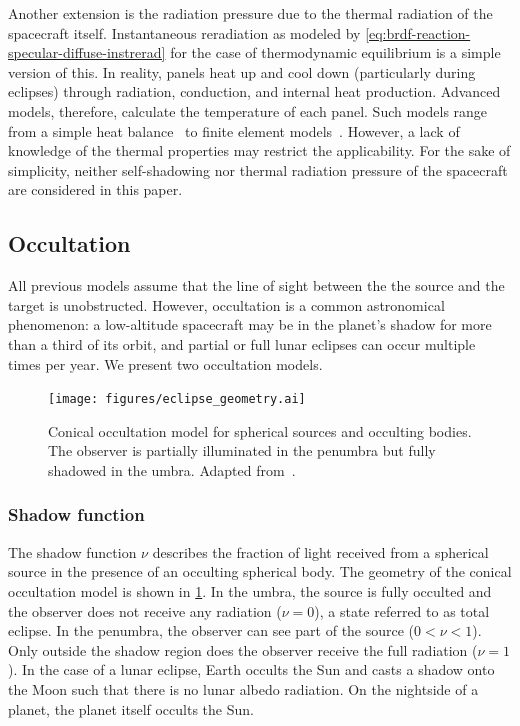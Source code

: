 Another extension is the radiation pressure due to the thermal radiation of the spacecraft itself. Instantaneous reradiation as modeled by \cref{eq:brdf-reaction-specular-diffuse-instrerad} for the case of thermodynamic equilibrium is a simple version of this. In reality, panels heat up and cool down (particularly during eclipses) through radiation, conduction, and internal heat production. Advanced models, therefore, calculate the temperature of each panel. Such models range from a simple heat balance~\cite{Wetterer2014} to finite element models~\cite{Woeske2019}. However, a lack of knowledge of the thermal properties may restrict the applicability. For the sake of simplicity, neither self-shadowing nor thermal radiation pressure of the spacecraft are considered in this paper.



\subsection{Occultation}
All previous models assume that the line of sight between the the source and the target is unobstructed. However, occultation is a common astronomical phenomenon: a low-altitude spacecraft may be in the planet's shadow for more than a third of its orbit, and partial or full lunar eclipses can occur multiple times per year. We present two occultation models.


\begin{figure}[t]
    \centering
    \texttt{[image: figures/eclipse\_geometry.ai]}
    \caption{Conical occultation model for spherical sources and occulting bodies. The observer is partially illuminated in the penumbra but fully shadowed in the umbra. Adapted from~\cite{Vallado2013}.}
    \label{fig:eclipse-geometry}
\end{figure}

\subsubsection{Shadow function}
The shadow function $\nu$ describes the fraction of light received from a spherical source in the presence of an occulting spherical body. The geometry of the conical occultation model is shown in \cref{fig:eclipse-geometry}. In the umbra, the source is fully occulted and the observer does not receive any radiation ($\nu = 0$), a state referred to as total eclipse. In the penumbra, the observer can see part of the source ($0 < \nu < 1$). Only outside the shadow region does the observer receive the full radiation ($\nu = 1$). In the case of a lunar eclipse, Earth occults the Sun and casts a shadow onto the Moon such that there is no lunar albedo radiation. On the nightside of a planet, the planet itself occults the Sun.

